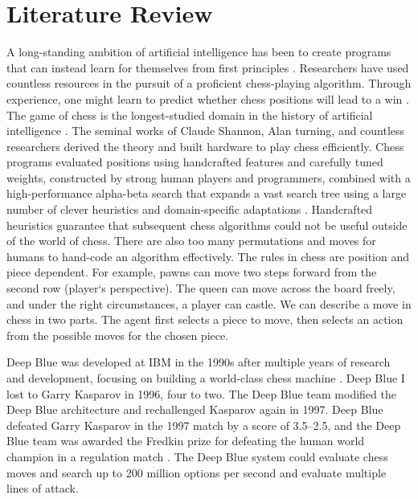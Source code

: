 \documentclass[12pt]{turabian-researchpaper}
\begin{document}
\section{Literature Review}

A long-standing ambition of artificial intelligence has been to create programs that can instead learn for themselves from first principles \parencite{silver_general_2018}. Researchers have used countless resources in the pursuit of a proficient chess-playing algorithm. Through experience, one might learn to predict whether chess positions will lead to a win \parencite{sutton1988learning}. The game of chess is the longest-studied domain in the history of artificial intelligence \parencite{silver_general_2018}. The seminal works of Claude Shannon, Alan turning, and countless researchers derived the theory and built hardware to play chess efficiently. Chess programs evaluated positions using handcrafted features and carefully tuned weights, constructed by strong human players and programmers, combined with a high-performance alpha-beta search that expands a vast search tree using a large number of clever heuristics and domain-specific adaptations \parencite{silver_general_2018}. Handcrafted heuristics guarantee that subsequent chess algorithms could not be useful outside of the world of chess. There are also too many permutations and moves for humans to hand-code an algorithm effectively. The rules in chess are position and piece dependent. For example, pawns can move two steps forward from the second row (player‘s perspective). The queen can move across the board freely, and under the right circumstances, a player can castle. We can describe a move in chess in two parts. The agent first selects a piece to move, then selects an action from the possible moves for the chosen piece.

Deep Blue was developed at IBM in the 1990s after multiple years of research and development, focusing on building a world-class chess machine \parencite{campbell_deep_2002}. Deep Blue I lost to Garry Kasparov in 1996, four to two. The Deep Blue team modified the Deep Blue architecture and rechallenged Kasparov again in 1997. Deep Blue defeated Garry Kasparov in the 1997 match by a score of 3.5–2.5, and the Deep Blue team was awarded the Fredkin prize for defeating the human world champion in a regulation match \parencite{campbell_deep_2002}. The Deep Blue system could evaluate chess moves and search up to 200 million options per second and evaluate multiple lines of attack. 
\end{document}
